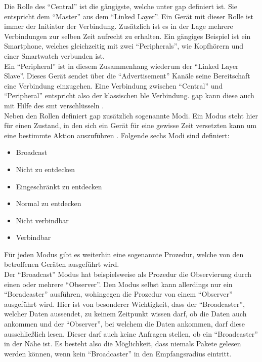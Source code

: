\noindent Die Rolle des "`Central"' ist die gängigste, welche unter \ac{gap} definiert ist. Sie entspricht dem "`Master"' aus dem "`Linked Layer"'. Ein Gerät mit dieser Rolle ist immer der Initiator der Verbindung. Zusätzlich ist es in der Lage mehrere Verbindungen zur selben Zeit aufrecht zu erhalten. Ein gängiges Beispiel ist ein Smartphone, welches gleichzeitig mit zwei "`Peripherals"', wie Kopfhörern und einer Smartwatch verbunden ist.\\

\noindent Ein "`Peripheral"' ist in diesem Zusammenhang wiederum der "`Linked Layer Slave"'. Dieses Gerät sendet über die "`Advertisement"' Kanäle seine Bereitschaft eine Verbindung einzugehen. Eine Verbindung zwischen "`Central"' und "`Peripheral"' entspricht also der klassischen \ac{ble} Verbindung. \ac{gap} kann diese auch mit Hilfe des \ac{smt} verschlüsseln \cite[Seite 34]{Usama17:BBS}.\\  

\noindent Neben den Rollen definiert \ac{gap} zusätzlich sogenannte Modi. Ein Modus steht hier für einen Zustand, in den sich ein Gerät für eine gewisse Zeit versetzten kann um eine bestimmte Aktion auszuführen \cite[Seite 35]{Townsend14:GSB}. Folgende sechs Modi sind definiert:
\begin{itemize}
	\item{Broadcast}
	\item{Nicht zu entdecken}
	\item{Eingeschränkt zu entdecken}
	\item{Normal zu entdecken}
	\item{Nicht verbindbar}
	\item{Verbindbar}
\end{itemize} 
Für jeden Modus gibt es weiterhin eine sogenannte Prozedur, welche von den betroffenen Geräten ausgeführt wird.\\

\noindent Der "`Broadcast"' Modus hat beispielsweise als Prozedur die Observierung durch einen oder mehrere "`Observer"'. Den Modus selbst kann allerdings nur ein "`Boradcaster"' ausführen, wohingegen die Prozedur von einem "`Observer"' ausgeführt wird. Hier ist von besonderer Wichtigkeit, dass der "`Broadcaster"', welcher Daten aussendet, zu keinem Zeitpunkt wissen darf, ob die Daten auch ankommen und der "`Observer"', bei welchem die Daten ankommen, darf diese ausschließlich lesen. Dieser darf auch keine Anfragen stellen, ob ein "`Broadcaster"' in der Nähe ist. Es besteht also die Möglichkeit, dass niemals Pakete gelesen werden können, wenn kein "`Broadcaster"' in den Empfangsradius eintritt.\\

